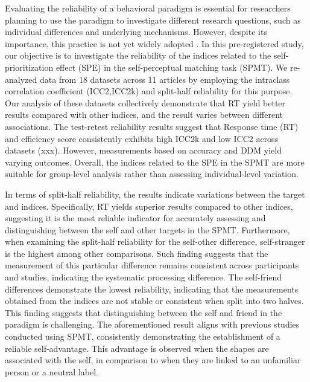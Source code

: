 \documentclass[sn-apa]{sn-jnl}%
\theoremstyle{thmstyleone}%
\theoremstyle{thmstyletwo}%
\theoremstyle{thmstylethree}%
\begin{document}
Evaluating the reliability of a behavioral paradigm is essential for researchers planning to use the paradigm to investigate different research questions, such as individual differences and underlying mechanisms. However, despite its importance, this practice is not yet widely adopted \parencite{hedge2018reliability, parsons2019psychological,green2016use}. In this pre-registered study, our objective is to investigate the reliability of the indices related to the self-prioritization effect (SPE) in the self-perceptual matching task (SPMT). We  re-analyzed data from 18 datasets across 11 articles by employing the intraclass correlation coefficient (ICC2,ICC2k) and split-half reliability for this purpose. Our analysis of these datasets collectively demonstrate that RT yield better results compared with other indices, and the result varies between different associations. The test-retest reliability results suggest that Response time (RT) and efficiency score consistently exhibits high ICC2k and low ICC2 across datasets (xxx). However, measurements based on accuracy and DDM yield varying outcomes. Overall, the indices related to the SPE in the SPMT are more suitable for group-level analysis rather than assessing individual-level variation.

In terms of split-half reliability, the results indicate variations between the target and indices. Specifically, RT yields superior results compared to other indices, suggesting it is the most reliable indicator for accurately assessing and distinguishing between the self and other targets in the SPMT. Furthermore, when examining the split-half reliability for the self-other difference, self-stranger is the highest among other comparisons. Such finding suggests that the measurement of this particular difference remains consistent across participants and studies, indicating the systematic processing difference. The self-friend differences demonstrate the lowest reliability, indicating that the measurements obtained from the indices are not stable or consistent when split into two halves. This finding suggests that distinguishing between the self and friend in the paradigm is challenging. The aforementioned result aligns with previous studies conducted using SPMT, consistently demonstrating the establishment of a reliable self-advantage. This advantage is observed when the shapes are associated with the self, in comparison to when they are linked to an unfamiliar person or a neutral label\parencite{sui2012perceptual,feng2020effect}. 
\end{document}

